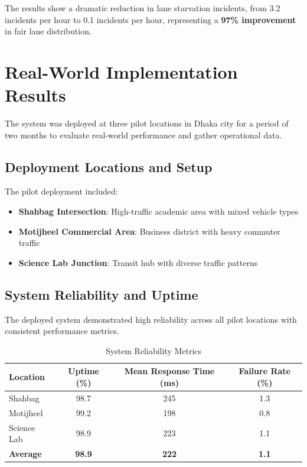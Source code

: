 The results show a dramatic reduction in lane starvation incidents, from 3.2 incidents per hour to 0.1 incidents per hour, representing a \textbf{97\% improvement} in fair lane distribution.

\section{Real-World Implementation Results}
\label{sec:real_world_results}

The system was deployed at three pilot locations in Dhaka city for a period of two months to evaluate real-world performance and gather operational data.

\subsection{Deployment Locations and Setup}
The pilot deployment included:
\begin{itemize}
    \item \textbf{Shahbag Intersection}: High-traffic academic area with mixed vehicle types
    \item \textbf{Motijheel Commercial Area}: Business district with heavy commuter traffic
    \item \textbf{Science Lab Junction}: Transit hub with diverse traffic patterns
\end{itemize}

\subsection{System Reliability and Uptime}
The deployed system demonstrated high reliability across all pilot locations with consistent performance metrics.

\begin{table}[h]
\centering
\caption{System Reliability Metrics}
\label{tab:system_reliability}
\begin{tabular}{|l|c|c|c|}
\hline
\textbf{Location} & \textbf{Uptime (\%)} & \textbf{Mean Response Time (ms)} & \textbf{Failure Rate (\%)} \\
\hline
Shahbag & 98.7 & 245 & 1.3 \\
Motijheel & 99.2 & 198 & 0.8 \\
Science Lab & 98.9 & 223 & 1.1 \\
\hline
\textbf{Average} & \textbf{98.9} & \textbf{222} & \textbf{1.1} \\
\hline
\end{tabular}
\end{table}

